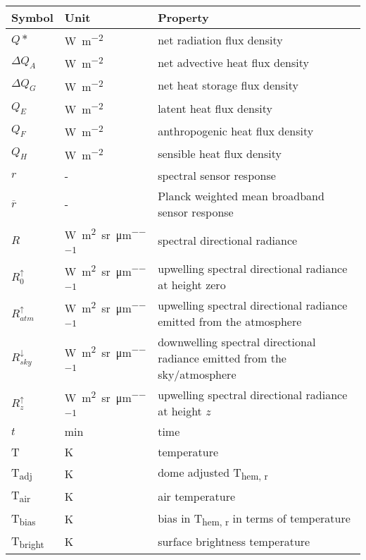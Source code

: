 \begin{table}[H]
	\centering
	\begin{tabular}{p{1.5cm}p{3cm}p{10cm}}
		\toprule
		Symbol & Unit & Property \\
		\midrule
		$Q*$ & \si{\watt\per\square\meter} & net radiation flux density \\
		$\Delta Q_A$ & \si{\watt\per\square\meter} & net advective heat flux density \\
		$\Delta Q_G$ & \si{\watt\per\square\meter} & net heat storage flux density \\
		$Q_E$ & \si{\watt\per\square\meter} & latent heat flux density \\
		$Q_F$ & \si{\watt\per\square\meter} & anthropogenic heat flux density \\
		$Q_H$ & \si{\watt\per\square\meter} & sensible heat flux density \\
		$ r $ & - & spectral sensor response \\
		$\overline{r}$ & - & Planck weighted mean broadband sensor response \\
		$R$ & \si{\watt\per\square\meter\per\steradian\per\micro\meter} & spectral directional radiance \\
		$R^{\uparrow}_0$ & \si{\watt\per\square\meter\per\steradian\per\micro\meter} & upwelling spectral directional radiance at height zero\\
		$R^{\uparrow}_{atm}$ & \si{\watt\per\square\meter\per\steradian\per\micro\meter} & upwelling spectral directional radiance emitted from the atmosphere\\
		$R^{\downarrow}_{sky}$ & \si{\watt\per\square\meter\per\steradian\per\micro\meter} & downwelling spectral directional radiance emitted from the sky/atmosphere\\
		$R^{\uparrow}_z$ & \si{\watt\per\square\meter\per\steradian\per\micro\meter} & upwelling spectral directional radiance at height $z$\\
		$t$ & \si{\minute} & time \\
		T & \si{\kelvin} & temperature \\
		T\textsubscript{adj} & \si{\kelvin} & dome adjusted T\textsubscript{hem, r} \\
		T\textsubscript{air} & \si{\kelvin} & air temperature \\
		T\textsubscript{bias} & \si{\kelvin} & bias in T\textsubscript{hem, r} in terms of temperature \\
		T\textsubscript{bright} & \si{\kelvin} & surface brightness temperature\\

\end{tabular}
\end{table}
